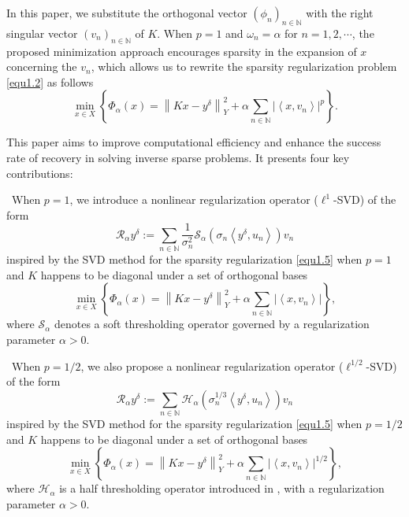 \documentclass[a4paper,12pt]{article}
\numberwithin{equation}{section}
\begin{document}
\par In this paper, we substitute the orthogonal vector $\left(\phi_{n}\right)_{n\in\mathbb{N}}$ with the right singular vector $\left(v_{n}\right)_{n\in\mathbb{N}}$ of $K$. When $p=1$ and $\omega_{n}=\alpha$ for $n=1,2,\cdots$, the proposed minimization approach encourages sparsity in the expansion of $x$ concerning the $v_{n}$, which allows us to rewrite the sparsity regularization problem \eqref{equ1.2} as follows
\begin{equation}\label{equ1.5}
    \min\limits_{x\in X}\left\{\Phi_{\alpha}(x)=\left\|Kx-y^{\delta}\right\|_Y^{2}+\alpha \sum_{n\in\mathbb{N}}\left|\left<x, v_{n}\right>\right|^{p}\right\}.
\end{equation}
\par This paper aims to improve computational efficiency and enhance the success rate of recovery in solving inverse sparse problems. It presents four key contributions:

\textbullet\ When $p=1$, we introduce a nonlinear regularization operator ($\ell^{1}$-SVD) of the form 
\begin{equation}\label{equ1.6}
      \mathcal{R}_{\alpha}y^{\delta}:=\sum_{n\in\mathbb{N}}\frac{1}{\sigma_{n}^{2}}\mathcal{S}_{\alpha}\left(\sigma_{n}\left< y^{\delta},u_{n}\right>\right)v_{n}
\end{equation}
inspired by the SVD method for the sparsity regularization \eqref{equ1.5} when $p=1$ and $K$ happens to be diagonal under a set of orthogonal bases
\begin{equation}\label{equ1.7}
    \min\limits_{x\in X}\left\{\Phi_{\alpha}(x)=\left\|Kx-y^{\delta}\right\|_{Y}^{2}+ \alpha\sum_{n\in\mathbb{N}}\left|\left<x,v_{n}\right>\right|\right\},
\end{equation}
where $\mathcal{S}_{\alpha}$ denotes a soft thresholding operator governed by a regularization parameter $\alpha>0$. 

\textbullet\ When $p=1/2$, we also propose a nonlinear regularization operator ($\ell^{1/2}$-SVD) of the form 
\begin{equation}\label{equ1.8}
    \mathcal{R}_{\alpha}y^{\delta}:=\sum_{n\in\mathbb{N}}\mathcal{H}_{\alpha}\left(\sigma_{n}^{1/3}\left<y^{\delta}, u_{n}\right>\right)v_{n}
\end{equation}
inspired by the SVD method for the sparsity regularization \eqref{equ1.5} when $p=1/2$ and $K$ happens to be diagonal under a set of orthogonal bases
\begin{equation}\label{equ1.9}
    \min\limits_{x\in X}\left\{\Phi_{\alpha}(x)=\left\|Kx-y^{\delta}\right\|_{Y}^{2} +\alpha\sum_{n\in\mathbb{N}}\left|\left<x,v_{n}\right>\right|^{1/2}\right\},
\end{equation}
where $\mathcal{H}_{\alpha}$ is a half thresholding operator introduced in \cite{XCXZ12}, with a regularization parameter $\alpha>0$. 
\end{document}

